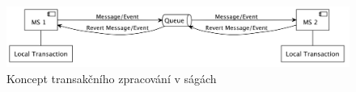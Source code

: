 \begin{figure}[htbp]
   \centering
   \includegraphics[max width=\textwidth]{assets/saga}
   \caption{Koncept transakčního zpracování v ságách}\label{fig:saga}
\end{figure}


